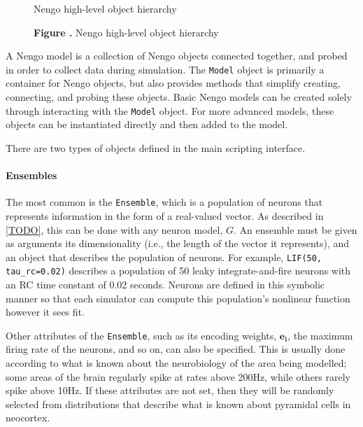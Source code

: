 \documentclass{frontiersSCNS}
\begin{document}
\begin{figure}
\begin{center}
  Nengo high-level object hierarchy
\end{center}
 \textbf{\label{fig:01} Figure .}{
   Nengo high-level object hierarchy}
\end{figure}

A Nengo model is a collection
of Nengo objects connected together,
and probed in order to collect data
during simulation.
The \texttt{Model} object is primarily a container
for Nengo objects,
but also provides methods
that simplify creating, connecting,
and probing these objects.
Basic Nengo models
can be created solely through interacting
with the \texttt{Model} object.
For more advanced models,
these objects can be instantiated
directly and then added to the model.

There are two types of objects
defined in the main scripting interface.

\paragraph{Ensembles}
The most common is the \texttt{Ensemble},
which is a population of neurons
that represents information
in the form of a real-valued vector.
As described in \eqref{TODO},
this can be done
with any neuron model, $G$.
An ensemble must be given as arguments
its dimensionality
(i.e., the length of the vector it represents),
and an object that describes
the population of neurons.
For example, \texttt{LIF(50, tau\_rc=0.02)}
describes a population
of 50 leaky integrate-and-fire neurons
with an RC time constant of 0.02 seconds.
Neurons are defined in this symbolic manner
so that each simulator can compute
this population's nonlinear function
however it sees fit.

Other attributes of the \texttt{Ensemble},
such as its encoding weights, $\mathbf{e_i}$,
the maximum firing rate of the neurons,
and so on, can also be specified.
This is usually done according
to what is known about
the neurobiology of the area being modelled;
some areas of the brain regularly spike
at rates above 200Hz,
while others rarely spike above 10Hz.
If these attributes are not set,
then they will be randomly selected
from distributions that describe
what is known about pyramidal cells in neocortex.

\end{document}
